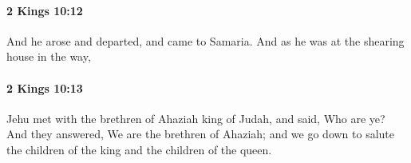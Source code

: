 		\paragraph{2 Kings 10:12} %
			\label{2KINGS-10-12}

			And he arose and departed, and came to Samaria. And as he was at the shearing house in the way,


		\paragraph{2 Kings 10:13} %
			\label{2KINGS-10-13}

			Jehu met with the brethren of Ahaziah king of Judah, and said, Who are ye? And they answered, We are the brethren of Ahaziah; and we go down to salute the children of the king and the children of the queen.


